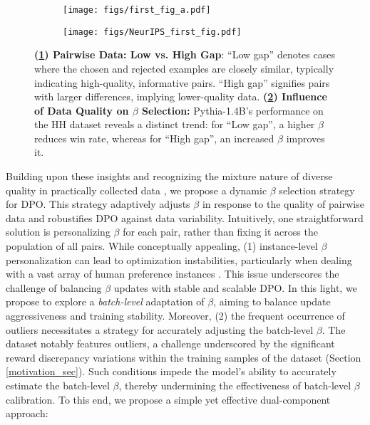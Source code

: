 \begin{figure}
    \centering
    \begin{subfigure}{.65\textwidth}
      \centering
      \texttt{[image: figs/first\_fig\_a.pdf]}
      \caption{} %
      \label{fig_1_1}
    \end{subfigure}%
    \hfill %
    \begin{subfigure}{.3\textwidth}
      \centering
      \texttt{[image: figs/NeurIPS\_first\_fig.pdf]}
      \caption{} %
      \label{fig_1_2}
    \end{subfigure}
    \caption{
    \textbf{(\ref{fig_1_1}) Pairwise Data: Low vs. High Gap}: ``Low gap'' denotes cases where the chosen and rejected examples are closely similar, typically indicating high-quality, informative pairs. ``High gap'' signifies pairs with larger differences, implying lower-quality data.
    \textbf{(\ref{fig_1_2}) Influence of Data Quality on $\beta$ Selection:} Pythia-1.4B's performance on the HH dataset reveals a distinct trend: for ``Low gap'', a higher $\beta$ reduces win rate, whereas for ``High gap'', an increased $\beta$ improves it.}
    \label{fig:combined}
\end{figure}

Building upon these insights and recognizing the mixture nature of diverse quality in practically collected data \cite{mixture_data},
we propose a dynamic $\beta$ selection strategy for DPO. This strategy adaptively adjusts $\beta$ in response to the quality of pairwise data and robustifies DPO against data variability. 
Intuitively, one straightforward solution is personalizing $\beta$ for each pair, rather than fixing it across the population of all pairs. While conceptually appealing, (1) instance-level $\beta$ personalization can lead to optimization instabilities, particularly when dealing with a vast array of human preference instances . This issue underscores the challenge of balancing $\beta$ updates with stable and scalable DPO. In this light, we propose to explore a \textit{batch-level} adaptation of $\beta$, aiming to balance update aggressiveness and training stability. Moreover, (2) the frequent occurrence of outliers necessitates a strategy for accurately adjusting the batch-level $\beta$. 
The dataset notably features outliers, a challenge underscored by the significant reward discrepancy variations within the training samples of the dataset (\cf Section \ref{motivation_sec}). 
Such conditions impede the model's ability to accurately estimate the batch-level $\beta$, thereby undermining the effectiveness of batch-level $\beta$ calibration.
To this end, we propose a simple yet effective dual-component approach:


